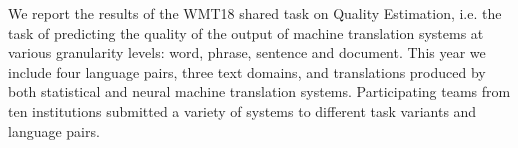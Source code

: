 We report the results of the WMT18 shared task on Quality Estimation, i.e. the task of predicting the quality of the output of machine translation systems at various granularity levels: word, phrase, sentence and document. This year we include four language pairs, three text domains, and translations produced by both statistical and neural machine translation systems. Participating teams from ten institutions submitted a variety of systems to different task variants and language pairs.
